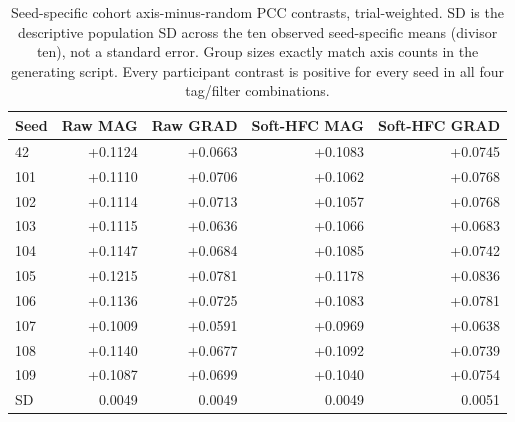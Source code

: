 \begin{table}[htbp]\centering\small
\begin{tabular}{lrrrr}
\toprule
Seed & Raw MAG & Raw GRAD & Soft-HFC MAG & Soft-HFC GRAD \\
\midrule
42 & +0.1124 & +0.0663 & +0.1083 & +0.0745 \\
101 & +0.1110 & +0.0706 & +0.1062 & +0.0768 \\
102 & +0.1114 & +0.0713 & +0.1057 & +0.0768 \\
103 & +0.1115 & +0.0636 & +0.1066 & +0.0683 \\
104 & +0.1147 & +0.0684 & +0.1085 & +0.0742 \\
105 & +0.1215 & +0.0781 & +0.1178 & +0.0836 \\
106 & +0.1136 & +0.0725 & +0.1083 & +0.0781 \\
107 & +0.1009 & +0.0591 & +0.0969 & +0.0638 \\
108 & +0.1140 & +0.0677 & +0.1092 & +0.0739 \\
109 & +0.1087 & +0.0699 & +0.1040 & +0.0754 \\
\midrule
SD & 0.0049 & 0.0049 & 0.0049 & 0.0051 \\
\bottomrule\end{tabular}
\caption{Seed-specific cohort axis-minus-random PCC contrasts, trial-weighted. SD is the descriptive population SD across the ten observed seed-specific means (divisor ten), not a standard error. Group sizes exactly match axis counts in the generating script. Every participant contrast is positive for every seed in all four tag/filter combinations.}
\label{tab:s-factorial-seeds}\end{table}

